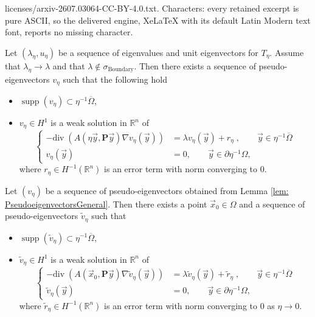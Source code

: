 \documentclass[10pt,a4paper]{amsart}
\newcommand{\R}{\mathbb{R}}
\renewcommand{\bar}[1]{\overline{#1}}
\renewcommand{\tilde}{\widetilde}
\begin{document}
licenses/arxiv-2607.03064-CC-BY-4.0.txt. Characters: every retained excerpt is pure ASCII, so the delivered engine, XeLaTeX with its default Latin Modern text font, reports no missing character.
\begin{lemma}\label{lem: PseudoeigenvectorsGeneral}
    Let $(\lambda_\eta, u_\eta)$ be a sequence of eigenvalues and unit eigenvectors for $T_\eta$. Assume that $\lambda_\eta\rightarrow\lambda$ and that $\lambda\notin \sigma_{\text{Boundary}}$. Then there exists a sequence of pseudo-eigenvectors $v_\eta$ such that the following hold
    \begin{itemize}
        \item $\operatorname{supp}(v_\eta)\subset\eta^{-1}\bar{\Omega}$,
        \item $v_\eta\in H^{1}$ is a weak solution in $\mathbb{R}^n$ of 
         \begin{equation} 
            \left\{
                \begin{aligned}
                    - \mathrm{div} \; \left( A\left( \eta \vec{y}, \textbf{P} \vec{y} \right) \nabla v_\eta({\vec y}) \right )& = \lambda v_\eta(\vec{y})+r_\eta \;, \qquad \vec{y} \in \eta^{-1}\bar{\Omega} \\
                    v_\eta(\vec{y})& = 0,\qquad \vec{y}\in\partial\eta^{-1}\Omega,
                \end{aligned}
            \right.
        \end{equation}
        where $r_\eta\in H^{-1}(\R^n)$ is an error term with norm converging to $0$.
    \end{itemize}
\end{lemma}

\begin{lemma}\label{lem: FrozenCoefficients}
    Let $(v_\eta)$ be a sequence of pseudo-eigenvectors obtained from Lemma \ref{lem: PseudoeigenvectorsGeneral}. Then there exists a point $\vec x_0\in \Omega$ and a sequence of pseudo-eigenvectors $\tilde{v}_\eta$ such that
    \begin{itemize}
        \item $\operatorname{supp}(\tilde{v}_\eta)\subset\eta^{-1}\bar{\Omega}$,
        \item $\tilde{v}_\eta\in H^1$ is a weak solution in $\mathbb{R}^n$ of 
         \begin{equation} 
            \left\{
                \begin{aligned}
                    - \mathrm{div} \; \left( A\left( \vec{x}_0, \textbf{P} \vec{y} \right) \nabla \tilde{v}_\eta({\vec y}) \right )& = \lambda \tilde{v}_\eta(\vec{y})+\tilde{r}_\eta \;, \qquad \vec{y} \in \eta^{-1}\bar{\Omega} \\
                    \tilde{v}_\eta(\vec{y})& = 0,\qquad \vec{y}\in\partial\eta^{-1}\Omega,
                \end{aligned}
            \right.
        \end{equation}
        where $\tilde{r}_\eta\in H^{-1}(\mathbb{R}^n)$ is  an error term with norm converging to $0$ as $\eta\to0$.
    \end{itemize}
\end{lemma}
\end{document}
